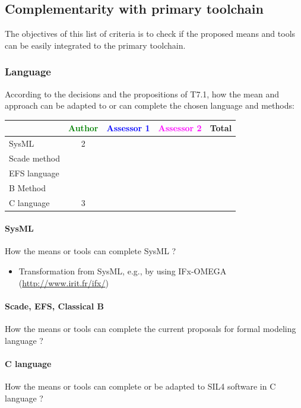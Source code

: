 \subsection{Complementarity with primary toolchain}

The objectives of this list of criteria is to check if the proposed means and tools can be easily integrated to the primary toolchain.

\subsubsection{Language}


According to the decisions and the propositions of T7.1, how the mean and approach can be adapted to or can complete the chosen language and methods:

\begin{tabular}{|l | c | c | c | c|}
\hline
& \textcolor{green}{Author} & \textcolor{blue}{Assessor 1} & \textcolor{magenta}{Assessor 2} & Total \\
\hline 
SysML  & 2 & & & \\
\hline
Scade method & & & & \\
\hline
EFS language & & & & \\
\hline
B Method & & & & \\
\hline
C language & 3 & & & \\
\hline
\end{tabular}

\paragraph{SysML}
How the means or tools can complete SysML ?

\begin{author_comment}
	\begin{itemize}
		\item Transformation from SysML, e.g., by using IFx-OMEGA (\url{http://www.irit.fr/ifx/})
	\end{itemize}
\end{author_comment}

\paragraph{Scade, EFS, Classical B}
How the means or tools can complete the current proposals for formal modeling language ?

\paragraph{C language}
How the means or tools can complete or be adapted to SIL4 software in C language ?

